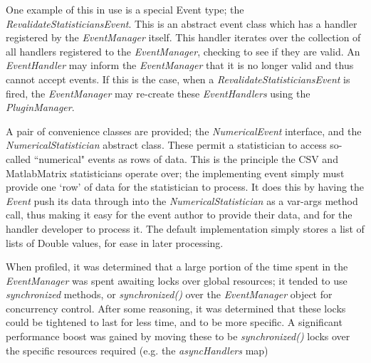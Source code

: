 \documentclass{acm_proc_article-sp}
\begin{document}
{One example of this in use is a special Event type; the {\textit{RevalidateStatisticiansEvent}}. This is an abstract event class which has a handler registered by the {\textit{EventManager}} itself. This handler iterates over the collection of all handlers registered to the {\textit{EventManager}}, checking to see if they are valid. An {\textit{EventHandler}} may inform the {\textit{EventManager}} that it is no longer valid and thus cannot accept events. If this is the case, when a {\textit{RevalidateStatisticiansEvent}} is fired, the {\textit{EventManager}} may re{}-create these {\textit{EventHandlers}} using the {\textit{PluginManager}}.

A pair of convenience classes are provided; the {\textit{NumericalEvent}} interface, and the {\textit{NumericalStatistician}} abstract class. These permit a statistician to access so{}-called ``numerical" events as rows of data. This is the principle the CSV and MatlabMatrix statisticians operate over; the implementing event simply must provide one `row' of data for the statistician to process. It does this by having the {\textit{Event}} push its data through into the {\textit{NumericalStatistician}} as a var{}-args method call, thus making it easy for the event author to provide their data, and for the handler developer to process it. The default implementation simply stores a list of lists of Double values, for ease in later processing.

When profiled, it was determined that a large portion of the time spent in the {\textit{EventManager}} was spent awaiting locks over global resources; it tended to use {\textit{synchronized}} methods, or {\textit{synchronized()}} over the {\textit{EventManager}} object for concurrency control. After some reasoning, it was determined that these locks could be tightened to last for less time, and to be more specific. A significant performance boost was gained by moving these to be {\textit{synchronized()}} locks over the specific resources required (e.g. the {\textit{asyncHandlers}} map)
}
\newpage
\end{document}

